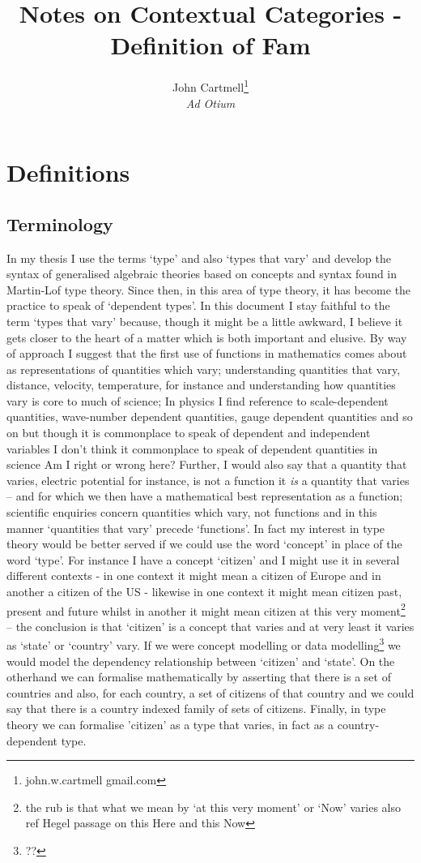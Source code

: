 \documentclass[10pt,a4paper]{scrartcl}
\title{Notes on Contextual Categories - Definition of Fam}
\author{John Cartmell\footnote{john.w.cartmell gmail.com}\\ \normalsize{\textit{Ad Otium}}}
\begin{document}
\maketitle

\section{Definitions}
\subsection{Terminology}
In my thesis I use the terms  `type' and also `types that vary' and develop the syntax of generalised algebraic theories based on concepts and syntax found in Martin-Lof type theory.
Since then, in this area of type theory,  it has become the practice to speak of `dependent types'. In this document I stay faithful to the term `types that vary' because, though it might be a little awkward, I believe it gets closer to the heart of a matter which is both important and elusive.
By way of approach I suggest that the first use of functions in mathematics comes about as representations of quantities which vary; understanding quantities that vary, distance, velocity, temperature, for instance and understanding how quantities vary is core to much of science;
In physics I find reference to scale-dependent quantities, wave-number dependent quantities, gauge dependent quantities and so on but though it is commonplace to speak of dependent and independent variables I don't think it commonplace to speak of dependent quantities in science
Am I right or wrong here? 
Further, I would also say that a quantity that varies,  electric potential for instance, is not a function it \textit{is} a quantity that varies -- and for which we then have a mathematical best representation as a function; scientific enquiries concern quantities which vary, not functions and in 
this manner `quantities that vary' precede `functions'. 
\noindent
In fact my interest in type theory would be better served if we could use the
word `concept' in place of the word `type'. For instance I have a concept `citizen' and I might use it in several different contexts - in one context it might mean a citizen of Europe and in another a citizen of the US - likewise in one context it might mean citizen past, present and future whilst in another it might mean citizen at this very moment\footnote{the rub is that what we mean by `at this very moment' or `Now' varies also ref Hegel passage on this Here and this Now}  -- the conclusion is that `citizen' is a concept that varies and at very least it varies as `state' or `country' vary. If we were concept modelling or data modelling\footnote{??} we would model the dependency relationship between `citizen' 
and `state'. On the otherhand we can formalise mathematically by asserting that there is a set of countries
and also, for each country, a set of citizens of that country and we could say that there is a country indexed family of sets of citizens. Finally, in type theory we can formalise 'citizen' as 
a type that varies, in fact as a country-dependent type.
\end{document}
